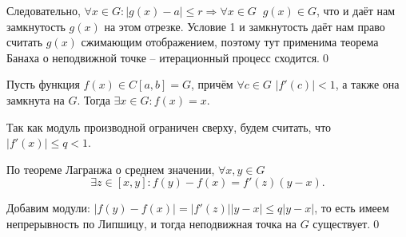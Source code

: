 \documentclass[../main.tex]{subfile}
\begin{document}
	Следовательно, $\forall x\in G: |g(x)-a|\le r\Rightarrow\forall x\in G\;\;g(x)\in G$,
	что и даёт нам замкнутость $g(x)$ на этом отрезке. Условие 1 и замкнутость
	даёт нам право считать $g(x)$ сжимающим отображением, поэтому тут применима
	теорема Банаха о неподвижной точке -- итерационный процесс сходится.\qed

\begin{corollary}
	Пусть функция $f(x)\in C[a,b]=G$, причём $\forall c\in G$ $|f'(c)|<1$,
	а также она замкнута на $G$. Тогда $\exists x\in G: f(x)=x$.
\end{corollary}\leavevmode\newline

\beginproof

	Так как модуль производной ограничен сверху, будем считать, что $|f'(x)|\le q<1$.

	По теореме Лагранжа о среднем значении, $\forall x,y\in G$ \\
	\[\exists z\in[x,y]: f(y)-f(x)=f'(z)(y-x).\]

	Добавим модули: $|f(y)-f(x)|=|f'(z)||y-x|\le q|y-x|$, то есть имеем
	непрерывность по Липшицу, и тогда неподвижная точка на $G$ существует.\qed
\end{document}
